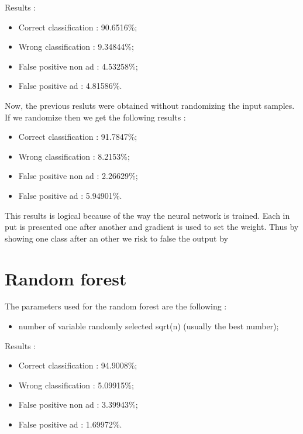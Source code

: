   Results :
  \begin{itemize}
    \item Correct classification : 90.6516\%;
    \item Wrong classification : 9.34844\%;
    \item False positive non ad : 4.53258\%;
    \item False positive ad : 4.81586\%.
  \end{itemize}

  Now, the previous resluts were obtained without randomizing the input samples. If we randomize then we get the following results :
  \begin{itemize}
    \item Correct classification : 91.7847\%;
    \item Wrong classification : 8.2153\%;
    \item False positive non ad : 2.26629\%;
    \item False positive ad : 5.94901\%.
  \end{itemize}

  This results is logical because of the way the neural network is trained. Each in put is presented one after another and gradient is used to set the weight. Thus by showing one class after an other we risk to false the output by
\section{Random forest}
The parameters used for the random forest are the following :
  \begin{itemize}
    \item number of variable randomly selected sqrt(n) (usually the best number);
  \end{itemize}
Results :
\begin{itemize}
  \item Correct classification : 94.9008\%;
  \item Wrong classification : 5.09915\%;
  \item False positive non ad : 3.39943\%;
  \item False positive ad : 1.69972\%.
\end{itemize}
